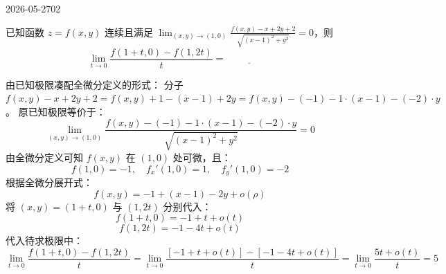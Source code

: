 \begin{mistake}{2026-05-27}{02}

\begin{problemcontent}
已知函数 \(z = f(x,y)\) 连续且满足 \(\lim_{(x,y) \to (1,0)} \frac{f(x,y) - x + 2y + 2}{\sqrt{(x-1)^2 + y^2}} = 0\)，则
\[ \lim_{t \to 0} \frac{f(1+t,0) - f(1,2t)}{t} = \underline{\hspace{2cm}} \]
\end{problemcontent}

\begin{solutioncontent}
由已知极限凑配全微分定义的形式：
分子 \(f(x,y) - x + 2y + 2 = f(x,y) + 1 - (x-1) + 2y = f(x,y) - (-1) - 1 \cdot (x-1) - (-2) \cdot y\)。
原已知极限等价于：
\[ \lim_{(x,y) \to (1,0)} \frac{f(x,y) - (-1) - 1 \cdot (x-1) - (-2) \cdot y}{\sqrt{(x-1)^2 + y^2}} = 0 \]
由全微分定义可知 \(f(x,y)\) 在 \((1,0)\) 处可微，且：
\[ f(1,0) = -1, \quad f_x'(1,0) = 1, \quad f_y'(1,0) = -2 \]
根据全微分展开式：
\[ f(x,y) = -1 + (x-1) - 2y + o(\rho) \]
将 \((x,y) = (1+t,0)\) 与 \((1,2t)\) 分别代入：
\[ f(1+t, 0) = -1 + t + o(t) \]
\[ f(1, 2t) = -1 - 4t + o(t) \]
代入待求极限中：
\[ \lim_{t \to 0} \frac{f(1+t,0) - f(1,2t)}{t} = \lim_{t \to 0} \frac{[-1 + t + o(t)] - [-1 - 4t + o(t)]}{t} = \lim_{t \to 0} \frac{5t + o(t)}{t} = 5 \]
\end{solutioncontent}


\end{mistake}

